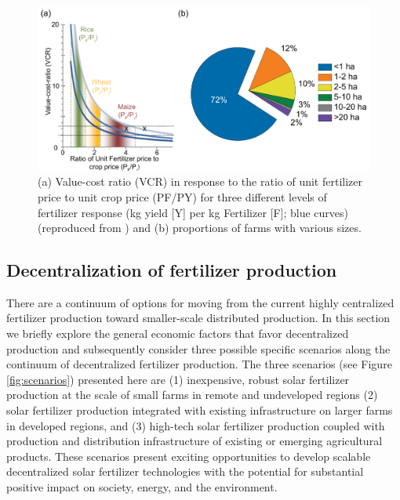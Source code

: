 \begin{figure}
    \centering
    \includegraphics[width=.8\textwidth]{Figures/value_cost_ratio_farm_size.pdf}
    \caption{(a) Value-cost ratio (VCR) in response to the ratio of unit fertilizer price to unit crop price (PF/PY) for
three different levels of fertilizer response (kg yield [Y] per kg Fertilizer [F]; blue curves) \cite{sommer_2013} (reproduced from \cite{Lowder_2016}) and (b) proportions of farms with various sizes.}
    \label{fig:vcr}
\end{figure}

\subsection{Decentralization of fertilizer production}
\label{sec:decentralized}

There are a continuum of options for moving from the current highly centralized fertilizer production toward smaller-scale distributed production. In this section we briefly explore the general economic factors that favor decentralized production and subsequently consider three possible specific scenarios along the continuum of decentralized fertilizer production.
The three scenarios (see Figure \ref{fig:scenarios}) presented here are (1) inexpensive, robust solar fertilizer production at the scale of small farms in remote and undeveloped regions (2) solar fertilizer production integrated with existing infrastructure on larger farms in developed regions, and (3) high-tech solar fertilizer production coupled with production and distribution infrastructure of existing or emerging agricultural products. These scenarios present exciting opportunities to develop scalable decentralized solar fertilizer technologies with the potential for substantial positive impact on society, energy, and the environment.


